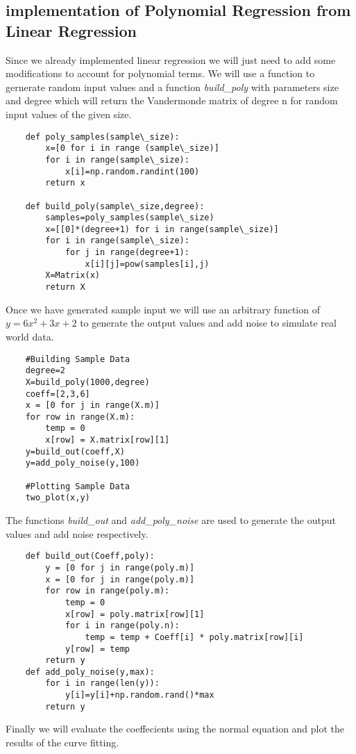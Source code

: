 \subsection{implementation of Polynomial Regression from Linear Regression}
Since we already implemented linear regression we will just need to add some modifications to account for polynomial terms.
We will use a function to gernerate random input values and a function \textit{build\_poly} with parameters size and degree which will return the Vandermonde matrix of degree n for random input values of the given size.
\begin{lstlisting}
    def poly_samples(sample\_size):
        x=[0 for i in range (sample\_size)]
        for i in range(sample\_size):
            x[i]=np.random.randint(100)
        return x

    def build_poly(sample\_size,degree):
        samples=poly_samples(sample\_size)
        x=[[0]*(degree+1) for i in range(sample\_size)]
        for i in range(sample\_size):
            for j in range(degree+1):
                x[i][j]=pow(samples[i],j)
        X=Matrix(x)
        return X
\end{lstlisting}
Once we have generated sample input we will use an arbitrary function of $y=6x^2+3x+2$ to generate the output values and add noise to simulate real world data.
\begin{lstlisting}
    #Building Sample Data
    degree=2
    X=build_poly(1000,degree)
    coeff=[2,3,6]
    x = [0 for j in range(X.m)]
    for row in range(X.m):
        temp = 0
        x[row] = X.matrix[row][1]
    y=build_out(coeff,X)
    y=add_poly_noise(y,100)

    #Plotting Sample Data
    two_plot(x,y)
\end{lstlisting}
The functions \textit{build\_out} and \textit{add\_poly\_noise} are used to generate the output values and add noise respectively.
\begin{lstlisting}
    def build_out(Coeff,poly):
        y = [0 for j in range(poly.m)]
        x = [0 for j in range(poly.m)]
        for row in range(poly.m):
            temp = 0
            x[row] = poly.matrix[row][1]
            for i in range(poly.n):
                temp = temp + Coeff[i] * poly.matrix[row][i]
            y[row] = temp
        return y
    def add_poly_noise(y,max):
        for i in range(len(y)):
            y[i]=y[i]+np.random.rand()*max
        return y
\end{lstlisting}
Finally we will evaluate the coeffecients using the normal equation and plot the results of the curve fitting.
